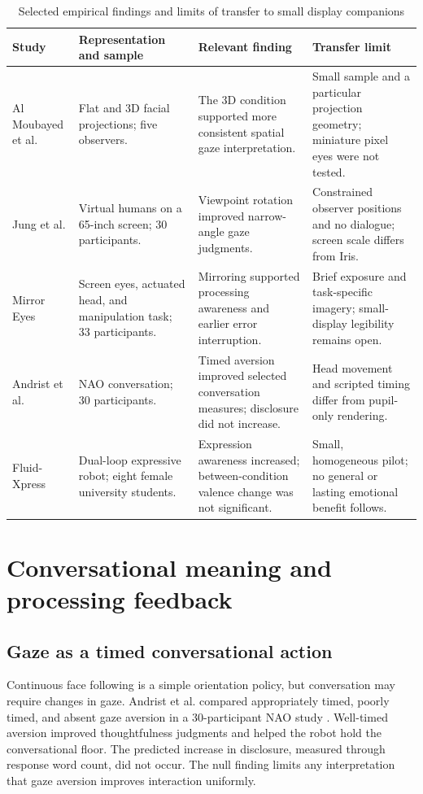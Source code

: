 \documentclass[journal]{IEEEtran}
\begin{document}
\begin{table}[t]
\caption{Selected empirical findings and limits of transfer to small display companions}
\label{tab:studies}
\centering
\footnotesize
\setlength{\tabcolsep}{5pt}
\renewcommand{\arraystretch}{1.15}
\begin{tabularx}{\textwidth}{@{}p{}p{}Y Y@{}}
\toprule
Study & Representation and sample & Relevant finding & Transfer limit \\
\midrule
Al Moubayed et al. \cite{almoubayed2012} & Flat and 3D facial projections; five observers. & The 3D condition supported more consistent spatial gaze interpretation. & Small sample and a particular projection geometry; miniature pixel eyes were not tested. \\
Jung et al. \cite{jung2023} & Virtual humans on a 65-inch screen; 30 participants. & Viewpoint rotation improved narrow-angle gaze judgments. & Constrained observer positions and no dialogue; screen scale differs from Iris. \\
Mirror Eyes \cite{mirror2025} & Screen eyes, actuated head, and manipulation task; 33 participants. & Mirroring supported processing awareness and earlier error interruption. & Brief exposure and task-specific imagery; small-display legibility remains open. \\
Andrist et al. \cite{andrist2014} & NAO conversation; 30 participants. & Timed aversion improved selected conversation measures; disclosure did not increase. & Head movement and scripted timing differ from pupil-only rendering. \\
Fluid-Xpress \cite{kang2026} & Dual-loop expressive robot; eight female university students. & Expression awareness increased; between-condition valence change was not significant. & Small, homogeneous pilot; no general or lasting emotional benefit follows. \\
\bottomrule
\end{tabularx}
\end{table}

\section{Conversational meaning and processing feedback}
\subsection{Gaze as a timed conversational action}
Continuous face following is a simple orientation policy, but conversation may require changes in gaze. Andrist et al. compared appropriately timed, poorly timed, and absent gaze aversion in a 30-participant NAO study \cite{andrist2014}. Well-timed aversion improved thoughtfulness judgments and helped the robot hold the conversational floor. The predicted increase in disclosure, measured through response word count, did not occur. The null finding limits any interpretation that gaze aversion improves interaction uniformly.
\end{document}
